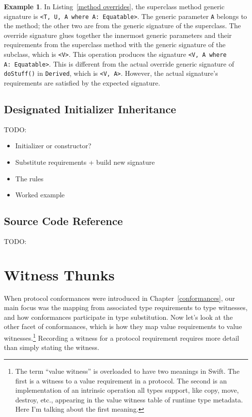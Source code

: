 \documentclass[a4paper,headsepline,bibliography=totoc,toc=flat,fleqn,twoside=semi]{scrbook}
\theoremstyle{definition}
\theoremstyle{definition}
\newtheorem{example}{Example}[chapter]
\theoremstyle{definition}
\newcommand{\ifWIP}{\iffalse}
\begin{document}
\begin{example} In Listing~\ref{method overrides}, the superclass method generic signature is \texttt{<T, U, A where A: Equatable>}. The generic parameter \texttt{A} belongs to the method; the other two are from the generic signature of the superclass. The override signature glues together the innermost generic parameters and their requirements from the superclass method with the generic signature of the subclass, which is \texttt{<V>}. This operation produces the signature \texttt{<V, A where A:\ Equatable>}. This is different from the actual override generic signature of \texttt{doStuff()} in \texttt{Derived}, which is \texttt{<V, A>}. However, the actual signature's requirements are satisfied by the expected signature.
\end{example}

\section{Designated Initializer Inheritance}

TODO:
\begin{itemize}
\item Initializer or constructor?
\item Substitute requirements + build new signature
\item The rules
\item Worked example
\end{itemize}

\section{Source Code Reference}

TODO:
\fi

\chapter{Witness Thunks}\label{valuerequirements}

\ifWIP

When protocol conformances were introduced in Chapter~\ref{conformances}, our main focus was the mapping from associated type requirements to type witnesses, and how conformances participate in type substitution. Now let's look at the other facet of conformances, which is how they map value requirements to value witnesses.\footnote{The term ``value witness'' is overloaded to have two meanings in Swift. The first is a witness to a value requirement in a protocol. The second is an implementation of an intrinsic operation all types support, like copy, move, destroy, etc., appearing in the value witness table of runtime type metadata. Here I'm talking about the first meaning.} Recording a witness for a protocol requirement requires more detail than simply stating the witness.
\end{document}
